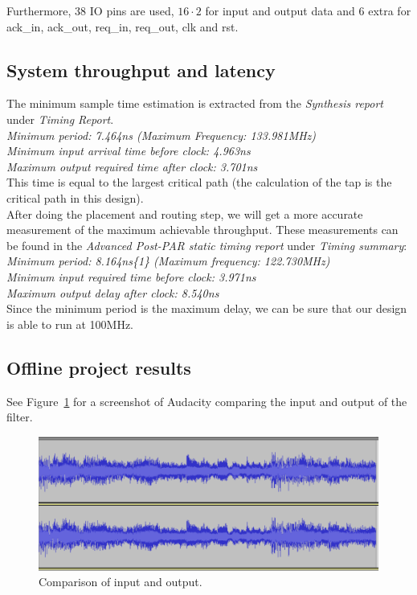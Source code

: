 \documentclass[a4paper,twoside,11pt, fleqn]{article}
\begin{document}
Furthermore, 38 IO pins are used, $16\cdot 2$ for input and output data and 6 extra for ack\_in, ack\_out, req\_in, req\_out, clk and rst.

\newpage
\subsection{System throughput and latency}
\label{sec:thr4}
The minimum sample time estimation is extracted from the \textit{Synthesis report} under \textit{Timing Report}.\\

   \textit{Minimum period:  7.464ns (Maximum Frequency: 133.981MHz)\\
   Minimum input arrival time before clock: 4.963ns\\
   Maximum output required time after clock: 3.701ns}\\

This time is equal to the largest critical path (the calculation of the tap is the critical path in this design).\\

After doing the placement and routing step, we will get a more accurate measurement of the maximum achievable throughput. These measurements can be found in the \textit{Advanced Post-PAR static timing report} under \textit{Timing summary}:\\

\textit{Minimum period:   8.164ns\{1\}   (Maximum frequency: 122.730MHz)\\
   Minimum input required time before clock:   3.971ns\\
   Maximum output delay after clock:   8.540ns}\\

Since the minimum period is the maximum delay, we can be sure that our design is able to run at 100MHz.

\newpage
\subsection{Offline project results}
\label{sec:4results}

See Figure~\ref{fig:compInOut} for a screenshot of Audacity comparing the input and output of the filter.

\begin{figure}[h]
	\includegraphics[scale = 0.76]{Images/offline_run_results.png}
    \caption{Comparison of input and output.}
    \label{fig:compInOut}
\end{figure}
\end{document}

